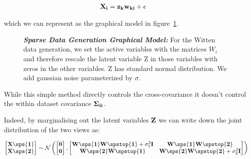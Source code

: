 \begin{align}\label{eq:wittengen}
    & \bold{X_i}=\bold{z_kw_{ki}}+\epsilon
\end{align}

which we can represent as the graphical model in figure~\ref{fig:wittengraphical}.

\begin{figure}
\centering
 \caption[Sparse Data Generation Graphical Model]{\textit{\textbf{Sparse Data Generation Graphical Model: }}For the Witten data generation, we set the active variables with the matrices $W_i$ and therefore rescale the latent variable Z in those variables with zeros in the other variables. Z has standard normal distribution. We add gaussian noise parameterized by $\sigma$.}
 \label{fig:wittengraphical}
\end{figure}

While this simple method directly controls the cross-covariance it doesn't control the within dataset covariance $\bold{\Sigma_{ii}}$.

Indeed, by marginalising out the latent variables $\bold{Z}$ we can write down the joint distribution of the two views as:

\begin{align}
    \begin{bmatrix} \bold{X\sps{1}} \\ \bold{X\sps{2}} \end{bmatrix} \sim \mathcal{N} \left( \begin{bmatrix} \bold{0} \\ \bold{0} \end{bmatrix}, \begin{bmatrix} \bold{W\sps{1}W\spstop{1}} + \sigma_1^2\bold{I} & \bold{W\sps{1}W\spstop{2}} \\ \bold{W\sps{2}W\spstop{1}} & \bold{W\sps{2}W\spstop{2}} + \sigma_2^2\bold{I} \end{bmatrix} \right)
\end{align}

